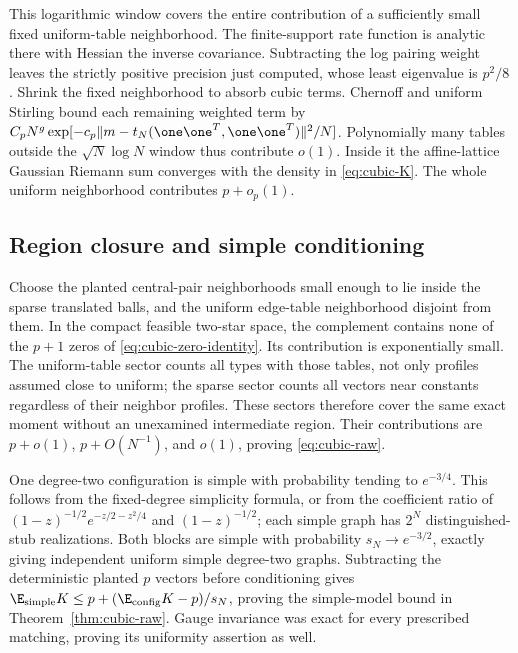 This logarithmic window covers the entire contribution of a sufficiently
small fixed uniform-table neighborhood. The finite-support rate
function is analytic there with Hessian the inverse covariance.
Subtracting the log pairing weight leaves the strictly positive
precision just computed, whose least eigenvalue is $p^2/8$.
Shrink the fixed neighborhood to absorb cubic terms. Chernoff and
uniform Stirling bound each remaining weighted term by
$C_pN^g\exp[-c_p\|m-t_N(\one\one^T,\one\one^T)\|^2/N]$.
Polynomially many tables outside the $\sqrt N\log N$ window thus
contribute $o(1)$. Inside it the affine-lattice Gaussian Riemann
sum converges with the density in \eqref{eq:cubic-K}.
The whole uniform neighborhood contributes $p+o_p(1)$.

\subsection{Region closure and simple conditioning}
Choose the planted central-pair neighborhoods small enough to lie
inside the sparse translated balls, and the uniform edge-table
neighborhood disjoint from them. In the compact feasible two-star
space, the complement contains none of the $p+1$ zeros of
\eqref{eq:cubic-zero-identity}. Its contribution is exponentially
small. The uniform-table sector counts all types with those tables,
not only profiles assumed close to uniform; the sparse sector counts
all vectors near constants regardless of their neighbor profiles.
These sectors therefore cover the same exact moment without an
unexamined intermediate region. Their contributions are $p+o(1)$,
$p+O(N^{-1})$, and $o(1)$, proving \eqref{eq:cubic-raw}.

One degree-two configuration is simple with probability tending to
$e^{-3/4}$. This follows from the fixed-degree simplicity formula,
or from the coefficient ratio of
$(1-z)^{-1/2}e^{-z/2-z^2/4}$ and $(1-z)^{-1/2}$; each simple
graph has $2^N$ distinguished-stub realizations. Both blocks are
simple with probability $s_N\to e^{-3/2}$, exactly giving independent
uniform simple degree-two graphs. Subtracting the deterministic
planted $p$ vectors before conditioning gives
$\E_{\rm simple}K\le p+(\E_{\rm config}K-p)/s_N$, proving the
simple-model bound in Theorem~\ref{thm:cubic-raw}.
Gauge invariance was exact for every prescribed matching, proving
its uniformity assertion as well.

